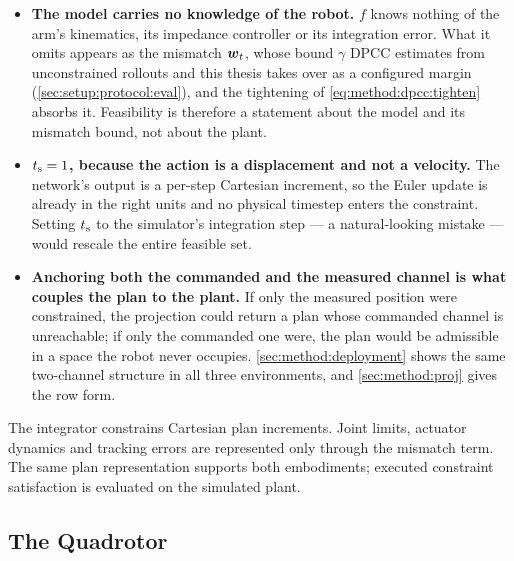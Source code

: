 \begin{itemize}
  \item \textbf{The model carries no knowledge of the robot.} $f$ knows nothing of the arm's
    kinematics, its impedance controller or its integration error. What it omits appears as the
    mismatch $\boldsymbol{w}_{t}$, whose bound $\gamma$ \ac{DPCC} estimates from unconstrained rollouts and this
    thesis takes over as a configured margin (\autoref{sec:setup:protocol:eval}), and the
    tightening of \eqref{eq:method:dpcc:tighten} absorbs it. Feasibility is therefore a statement
    about the model and its mismatch bound, not about the plant.
  \item \textbf{$t_{\textrm{s}} = 1$, because the action is a displacement and not a velocity.} The
    network's output is a per-step Cartesian increment, so the Euler update is already in the right
    units and no physical timestep enters the constraint. Setting $t_{\textrm{s}}$ to the simulator's
    integration step --- a natural-looking mistake --- would rescale the entire feasible set.
  \item \textbf{Anchoring both the commanded and the measured channel is what couples the plan to
    the plant.} If only the measured position were constrained, the projection could return a plan
    whose commanded channel is unreachable; if only the commanded one were, the plan would be
    admissible in a space the robot never occupies. \autoref{sec:method:deployment} shows the same
    two-channel structure in all three environments, and \autoref{sec:method:proj} gives the row form.
\end{itemize}

\begin{remark}\label{rem:eulermodel}
The integrator constrains Cartesian plan increments. Joint limits, actuator dynamics and tracking
errors are represented only through the mismatch term. The same plan representation supports both
embodiments; executed constraint satisfaction is evaluated on the simulated plant.
\end{remark}

\subsection{The Quadrotor}\label{sec:method:quadrotor}

